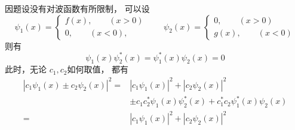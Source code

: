 \begin{frame} 
    \frametitle{}
    因题设没有对波函数有所限制， 可以设 \[ \psi_1(x) =  \begin{cases}
        f(x), \qquad (x>0) \\
        0, \qquad (x<0), 
        \end{cases}
        \qquad  
        \psi_2(x) =  \begin{cases}
            0, \qquad (x>0) \\
            g(x), \qquad (x<0)
        \end{cases} \]
        则有 \[ \psi_1(x)\psi_2^*(x) = \psi_1^*(x)\psi_2(x) = 0 \]
        此时，无论 $c_1, c_2$如何取值， 都有
        \[ \begin{aligned}
            \left|c_1\psi_1(x) \pm c_2 \psi_2(x)\right|^2 = &\left|c_1\psi_1(x)\right|^2 
            +  \left| c_2 \psi_2(x)\right|^2 \\ 
            &\pm c_1c_2^* \psi_1(x)\psi_2^*(x) + c_1^* c_2\psi_1^*(x)\psi_2(x) \\
            = &\left|c_1\psi_1(x)\right|^2 + \left| c_2 \psi_2(x)\right|^2\\
        \end{aligned}\] 
    \end{frame}